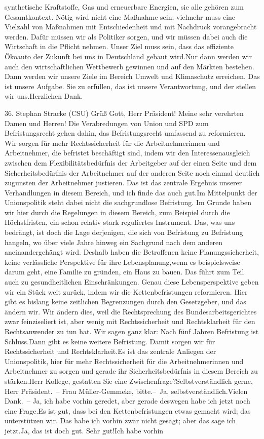 \documentclass{article}
\begin{document}
synthetische Kraftstoffe, Gas und erneuerbare Energien, sie alle gehören zum Gesamtkontext. Nötig wird nicht eine Maßnahme sein; vielmehr muss eine Vielzahl von Maßnahmen mit Entschiedenheit und mit Nachdruck vorangebracht werden. Dafür müssen wir als Politiker sorgen, und wir müssen dabei auch die Wirtschaft in die Pflicht nehmen. Unser Ziel muss sein, dass das effiziente Ökoauto der Zukunft bei uns in Deutschland gebaut wird.Nur dann werden wir auch den wirtschaftlichen Wettbewerb gewinnen und auf den Märkten bestehen. Dann werden wir unsere Ziele im Bereich Umwelt und Klimaschutz erreichen. Das ist unsere Aufgabe. Sie zu erfüllen, das ist unsere Verantwortung, und der stellen wir uns.Herzlichen Dank.




	36. Stephan Stracke (CSU) Grüß Gott, Herr Präsident! Meine sehr verehrten Damen und Herren! Die Verabredungen von Union und SPD zum Befristungsrecht gehen dahin, das Befristungsrecht umfassend zu reformieren. Wir sorgen für mehr Rechtssicherheit für die Arbeitnehmerinnen und Arbeitnehmer, die befristet beschäftigt sind, indem wir den Interessenausgleich zwischen dem Flexibilitätsbedürfnis der Arbeitgeber auf der einen Seite und dem Sicherheitsbedürfnis der Arbeitnehmer auf der anderen Seite noch einmal deutlich zugunsten der Arbeitnehmer justieren. Das ist das zentrale Ergebnis unserer Verhandlungen in diesem Bereich, und ich finde das auch gut.Im Mittelpunkt der Unionspolitik steht dabei nicht die sachgrundlose Befristung. Im Grunde haben wir hier durch die Regelungen in diesem Bereich, zum Beispiel durch die Höchstfristen, ein schon relativ stark reguliertes Instrument. Das, was uns bedrängt, ist doch die Lage derjenigen, die sich von Befristung zu Befristung hangeln, wo über viele Jahre hinweg ein Sachgrund nach dem anderen aneinandergehängt wird. Deshalb haben die Betroffenen keine Planungssicherheit, keine verlässliche Perspektive für ihre Lebensplanung,wenn es beispielsweise darum geht, eine Familie zu gründen, ein Haus zu bauen. Das führt zum Teil auch zu gesundheitlichen Einschränkungen. Genau diese Lebensperspektive geben wir ein Stück weit zurück, indem wir die Kettenbefristungen reformieren. Hier gibt es bislang keine zeitlichen Begrenzungen durch den Gesetzgeber, und das ändern wir. Wir ändern dies, weil die Rechtsprechung des Bundesarbeitsgerichtes zwar feinziseliert ist, aber wenig mit Rechtssicherheit und Rechtsklarheit für den Rechtsanwender zu tun hat. Wir sagen ganz klar: Nach fünf Jahren Befristung ist Schluss.Dann gibt es keine weitere Befristung. Damit sorgen wir für Rechtssicherheit und Rechtsklarheit.Es ist das zentrale Anliegen der Unionspolitik, hier für mehr Rechtssicherheit für die Arbeitnehmerinnen und Arbeitnehmer zu sorgen und gerade ihr Sicherheitsbedürfnis in diesem Bereich zu stärken.Herr Kollege, gestatten Sie eine Zwischenfrage?Selbstverständlich gerne, Herr Präsident. – Frau Müller-Gemmeke, bitte.– Ja, selbstverständlich.Vielen Dank. – Ja, ich habe vorhin geredet, aber gerade deswegen habe ich jetzt noch eine Frage.Es ist gut, dass bei den Kettenbefristungen etwas gemacht wird; das unterstützen wir. Das habe ich vorhin zwar nicht gesagt; aber das sage ich jetzt.Ja, das ist doch gut. Sehr gut!Ich habe vorhin 
\end{document}
